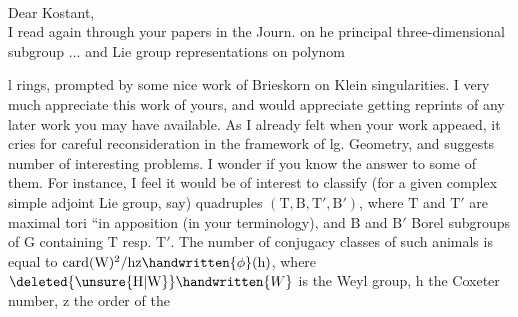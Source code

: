 \hfill{}\\

Dear Kostant,\\

I read again through your papers in the  Journ. on he principal three-dimensional subgroup ... and Lie group representations on polynoml rings, prompted by some nice work of Brieskorn on Klein singularities. I very much appreciate this work of yours, and would appreciate getting reprints of any later work you may have available. As I already felt when your work appeaed, it cries for careful reconsideration in the framework of lg. Geometry, and suggests number of interesting problems. I wonder if you know the answer to some of them. For instance, I feel it would be of interest to classify (for a given complex simple adjoint Lie group, say) quadruples $(\mathrm{T},\mathrm{B},\mathrm{T}',\mathrm{B}')$, where $\mathrm{T}$ and $\mathrm{T}'$ are maximal tori ``in apposition (in your terminology), and $\mathrm{B}$ and $\mathrm{B}'$ Borel subgroups of $\mathrm{G}$ containing $\mathrm{T}$ resp. $\mathrm{T}'$. The number of conjugacy classes of such animals is equal to $\operatorname{card}(\mathrm{W})^{2}/\mathrm{hz}\handwritten{\phi}(\mathrm{h})$, where $\deleted{\unsure{\mathrm{H}|\mathrm{W}}}\handwritten{W}$ is the Weyl group, $\mathrm{h}$ the Coxeter number, $\mathrm{z}$ the order of the 

